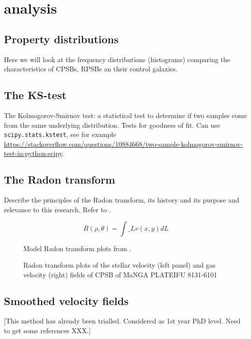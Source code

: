 \section{analysis}
\label{sec:analysis}

\subsection{Property distributions}
Here we will look at the frequency distributions (histograms) comparing the characteristics of CPSBs, RPSBs an their control galaxies.

\subsection{The KS-test}
The Kolmogorov-Smirnov test: a statistical test to determine if two samples come from the same underlying distribution. Tests for goodness of fit. Can use \texttt{scipy.stats.kstest}, see for example \url{https://stackoverflow.com/questions/10884668/two-sample-kolmogorov-smirnov-test-in-python-scipy}.

\subsection{The Radon transform}
Describe the principles of the Radon transform, its history and its purpose and relevance to this research. Refer to \cite{2018MNRAS.480.2217S}.

\begin{equation}
    R(\rho,\theta)=\int\_L{v(x,y)dL}
\end{equation}

\begin{figure}
    \centering
    \caption{Model Radon transform plots from \cite{2018MNRAS.480.2217S}.}
    \label{fig:Radon}
\end{figure}

\begin{figure}
    \centering
    \caption{Radon transform plots of the stellar velocity (left panel) and gas velocity (right) fields of CPSB of MaNGA PLATEIFU 8131-6101}
    \label{fig:RT_8131-6101}
\end{figure}

\subsection{Smoothed velocity fields}
[This method has already been trialled. Considered as 1st year PhD level. Need to get some references XXX.]